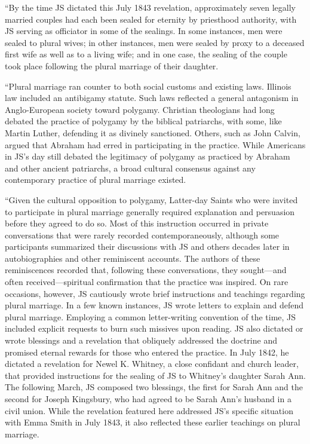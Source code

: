 			``By the time JS dictated this July 1843 revelation, approximately seven legally married couples had each been sealed for eternity by priesthood authority, with JS serving as officiator in some of the sealings. In some instances, men were sealed to plural wives; in other instances, men were sealed by proxy to a deceased first wife as well as to a living wife; and in one case, the sealing of the couple took place following the plural marriage of their daughter.

			``Plural marriage ran counter to both social customs and existing laws. Illinois law included an antibigamy statute. Such laws reflected a general antagonism in Anglo-European society toward polygamy. Christian theologians had long debated the practice of polygamy by the biblical patriarchs, with some, like Martin Luther, defending it as divinely sanctioned. Others, such as John Calvin, argued that Abraham had erred in participating in the practice. While Americans in JS's day still debated the legitimacy of polygamy as practiced by Abraham and other ancient patriarchs, a broad cultural consensus against any contemporary practice of plural marriage existed.

			``Given the cultural opposition to polygamy, Latter-day Saints who were invited to participate in plural marriage generally required explanation and persuasion before they agreed to do so. Most of this instruction occurred in private conversations that were rarely recorded contemporaneously, although some participants summarized their discussions with JS and others decades later in autobiographies and other reminiscent accounts. The authors of these reminiscences recorded that, following these conversations, they sought---and often received---spiritual confirmation that the practice was inspired. On rare occasions, however, JS cautiously wrote brief instructions and teachings regarding plural marriage. In a few known instances, JS wrote letters to explain and defend plural marriage. Employing a common letter-writing convention of the time, JS included explicit requests to burn such missives upon reading. JS also dictated or wrote blessings and a revelation that obliquely addressed the doctrine and promised eternal rewards for those who entered the practice. In July 1842, he dictated a revelation for Newel K. Whitney, a close confidant and church leader, that provided instructions for the sealing of JS to Whitney's daughter Sarah Ann. The following March, JS composed two blessings, the first for Sarah Ann and the second for Joseph Kingsbury, who had agreed to be Sarah Ann's husband in a civil union. While the revelation featured here addressed JS's specific situation with Emma Smith in July 1843, it also reflected these earlier teachings on plural marriage.

